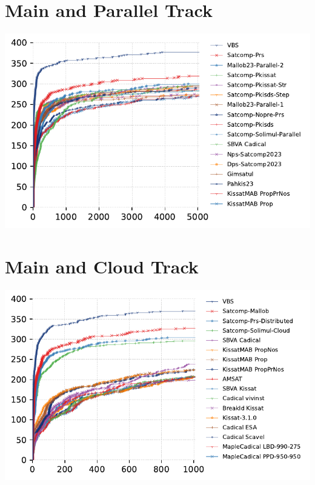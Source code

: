 \documentclass{article}
\begin{document}
\section{Main and Parallel Track}
\includegraphics[width=\linewidth]{gen/sc2023/main-parallel/cdf.pdf}



\section{Main and Cloud Track}
\includegraphics[width=\linewidth]{gen/sc2023/main-cloud/cdf.pdf}


\end{document}
